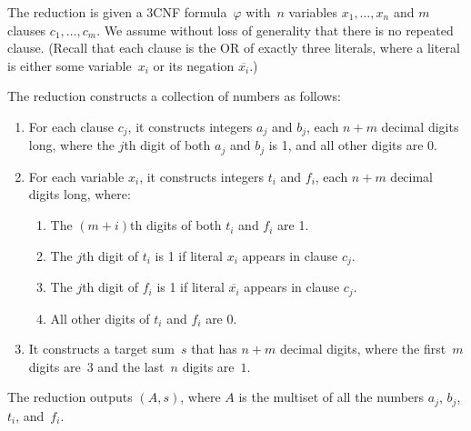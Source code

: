\documentclass[11pt,addpoints]{exam}
\begin{document}
\begin{questions}
  The reduction is given a 3CNF formula~$\varphi$ with~$n$ variables $x_1, \ldots, x_n$ and $m$ clauses $c_1, \ldots, c_m$.
  We assume without loss of generality that there is no repeated clause.
  (Recall that each clause is the OR of exactly three literals, where a literal is either some variable~$x_{i}$ or its negation $\overline{x_{i}}$.)

  The reduction constructs a collection of numbers as follows:
  \begin{enumerate}
  \item For each clause $c_j$, it constructs integers $a_j$ and $b_j$, each $n + m$ decimal digits long, where the $j$th digit of both $a_j$ and $b_j$ is 1, and all other digits are 0.
  \item For each variable $x_i$, it constructs integers $t_i$ and $f_i$, each $n + m$ decimal digits long, where:
    \begin{enumerate}
    \item The $(m + i)$th digits of both $t_i$ and $f_i$ are 1.
    \item The $j$th digit of $t_i$ is 1 if literal $x_i$ appears
      in clause $c_j$.
    \item The $j$th digit of $f_i$ is 1 if literal $\overline{x_i}$
      appears in clause $c_j$.
    \item All other digits of $t_i$ and $f_i$ are 0.
    \end{enumerate}
  \item It constructs a target sum~$s$ that has $n + m$ decimal digits, where the first~$m$ digits are~$3$ and the last~$n$ digits are~$1$.
  \end{enumerate}
  The reduction outputs $(A,s)$, where $A$ is the multiset of all the numbers $a_{j}$, $b_{j}$, $t_{i}$, and~$f_{i}$.


\end{questions}
\end{document}
